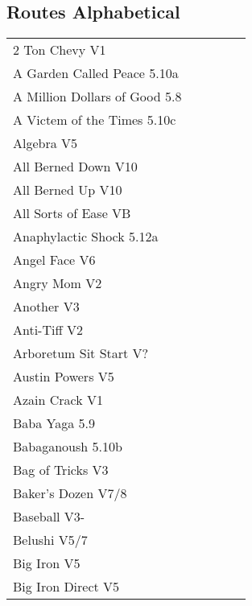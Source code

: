 \begin{flushleft}

\needspace{1.5cm}
\section{Routes Alphabetical}
\begin{center}
\begin{supertabular}{p{0.76\linewidth}p{0.08\linewidth}}
2 Ton Chevy V1 & \pageref{rt:2 Ton Chevy} \\
A Garden Called Peace 5.10a & \pageref{rt:A Garden Called Peace} \\
A Million Dollars of Good 5.8 & \pageref{rt:A Million Dollars of Good} \\
A Victem of the Times 5.10c & \pageref{vr:A Victem of the Times} \\
Algebra V5 & \pageref{rt:Algebra} \\
All Berned Down V10 & \pageref{rt:All Berned Down} \\
All Berned Up V10 & \pageref{rt:All Berned Up} \\
All Sorts of Ease VB & \pageref{rt:All Sorts of Ease} \\
Anaphylactic Shock 5.12a & \pageref{rt:Anaphylactic Shock} \\
Angel Face V6 & \pageref{rt:Angel Face} \\
Angry Mom V2 & \pageref{rt:Angry Mom} \\
Another V3 & \pageref{rt:Another} \\
Anti-Tiff V2 & \pageref{rt:Anti-Tiff} \\
Arboretum Sit Start V? & \pageref{vr:Arboretum Sit Start} \\
Austin Powers V5 & \pageref{rt:Austin Powers} \\
Azain Crack V1 & \pageref{vr:Azain Crack} \\
Baba Yaga 5.9 & \pageref{rt:Baba Yaga} \\
Babaganoush 5.10b & \pageref{rt:Babaganoush} \\
Bag of Tricks V3 & \pageref{vr:Bag of Tricks} \\
Baker's Dozen V7/8 & \pageref{vr:Baker's Dozen} \\
Baseball V3- & \pageref{rt:Baseball} \\
Belushi V5/7 & \pageref{rt:Belushi} \\
Big Iron V5 & \pageref{rt:Big Iron} \\
Big Iron Direct V5 & \pageref{vr:Big Iron Direct} \\

\end{supertabular}
\end{center}
\end{flushleft}
